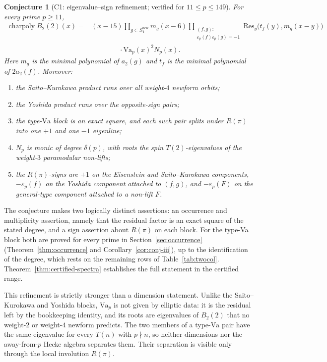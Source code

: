 \documentclass[11pt]{amsart}
\theoremstyle{plain}
\newtheorem{conjecture}[theorem]{Conjecture}
\theoremstyle{definition}
\newcommand{\Res}{\mathrm{Res}}
\newcommand{\Va}{\mathrm{Va}}
\newcommand{\snew}{S^{\mathrm{new}}}
\newcommand{\eps}{\varepsilon}
\DeclareMathOperator{\charp}{charpoly}
\providecommand{\Va}{\mathrm{Va}}
\providecommand{\snew}{S^{\mathrm{new}}}
\providecommand{\charp}{\operatorname{charpoly}}
\begin{document}
	\begin{conjecture}[C1: eigenvalue--sign refinement; verified for $11\le p\le149$]
		\label{conj:eigenvalue-sign} \label{conj:refined}
		For every prime $p\ge11$,
		\begin{equation}\label{eq:C1-factorization}
			\begin{split}
				\charp B_2(2)(x)
				={}&(x-15)
				\prod_{g\subset\snew_4}m_g(x-6)
				\prod_{\substack{(f,g):\\ \eps_p(f)\eps_p(g)=-1}}
				\Res_y\bigl(t_f(y),m_g(x-y)\bigr)\\
				&\qquad\qquad\cdot \Va_p(x)^2N_p(x).
			\end{split}
		\end{equation}
		Here $m_g$ is the minimal polynomial of $a_2(g)$ and $t_f$ is the minimal
		polynomial of $2a_2(f)$. Moreover:
		\begin{enumerate}[label=\textup{(\roman*)},leftmargin=2.5em]
			\item the Saito--Kurokawa product runs over all weight-$4$ newform orbits;
			\item the Yoshida product runs over the opposite-sign pairs;
			\item the type-$\Va$ block is an exact square, and each such pair splits
			under $R(\pi)$ into one $+1$ and one $-1$ eigenline;
			\item $N_p$ is monic of degree $\delta(p)$, with roots the spin
			$T(2)$-eigenvalues of the weight-$3$ paramodular non-lifts;
			\item the $R(\pi)$-signs are $+1$ on the Eisenstein and
			Saito--Kurokawa components, $-\eps_p(f)$ on the Yoshida component attached
			to $(f,g)$, and $-\eps_p(F)$ on the general-type component attached to a
			non-lift $F$.
		\end{enumerate}
	\end{conjecture}
	
	The conjecture makes two logically distinct assertions: an occurrence and
	multiplicity assertion, namely that the residual factor is an exact square
	of the stated degree, and a sign assertion about $R(\pi)$ on each block.
	For the type-Va block both are proved for every prime in
	Section~\ref{sec:occurrence} (Theorem~\ref{thm:occurrence} and
	Corollary~\ref{cor:conj-iii}), up to the identification of the degree,
	which rests on the remaining rows of Table~\ref{tab:twocol}.
	Theorem~\ref{thm:certified-spectra} establishes the full statement in the
	certified range.
	
	This refinement is strictly stronger than a dimension statement. Unlike
	the Saito--Kurokawa and Yoshida blocks, $\Va_p$ is not given by elliptic
	data: it is the residual left by the bookkeeping identity, and its roots
	are eigenvalues of $B_2(2)$ that no weight-$2$ or weight-$4$ newform
	predicts. The two
	members of a type-$\Va$ pair have the same eigenvalue for every $T(n)$
	with $p\nmid n$, so neither dimensions nor the away-from-$p$ Hecke
	algebra separates them. Their separation is visible only through the local
	involution $R(\pi)$.
	
\end{document}
